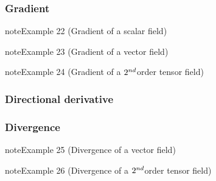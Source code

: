 \documentclass[letterpaper,10pt,english]{jupyterBook}
\begin{document}
\subsubsection{Gradient}
\label{\detokenize{ch/tensor-algebra-calculus/calculus-euclidean-spherical:gradient}}\label{\detokenize{ch/tensor-algebra-calculus/calculus-euclidean-spherical:tensor-calculus-spherical-differential-operators-gradient}}\label{ch/tensor-algebra-calculus/calculus-euclidean-spherical:example-0}
\begin{sphinxadmonition}{note}{Example 22 (Gradient of a scalar field)}


\end{sphinxadmonition}
\label{ch/tensor-algebra-calculus/calculus-euclidean-spherical:example-1}
\begin{sphinxadmonition}{note}{Example 23 (Gradient of a vector field)}


\end{sphinxadmonition}
\label{ch/tensor-algebra-calculus/calculus-euclidean-spherical:example-2}
\begin{sphinxadmonition}{note}{Example 24 (Gradient of a \protect\(2^{nd}\protect\)\sphinxhyphen{}order tensor field)}


\end{sphinxadmonition}


\subsubsection{Directional derivative}
\label{\detokenize{ch/tensor-algebra-calculus/calculus-euclidean-spherical:directional-derivative}}\label{\detokenize{ch/tensor-algebra-calculus/calculus-euclidean-spherical:tensor-calculus-spherical-differential-operators-directional-der}}

\subsubsection{Divergence}
\label{\detokenize{ch/tensor-algebra-calculus/calculus-euclidean-spherical:divergence}}\label{\detokenize{ch/tensor-algebra-calculus/calculus-euclidean-spherical:tensor-calculus-spherical-differential-operators-divergence}}\label{ch/tensor-algebra-calculus/calculus-euclidean-spherical:example-3}
\begin{sphinxadmonition}{note}{Example 25 (Divergence of a vector field)}


\end{sphinxadmonition}
\label{ch/tensor-algebra-calculus/calculus-euclidean-spherical:example-4}
\begin{sphinxadmonition}{note}{Example 26 (Divergence of a \protect\(2^{nd}\protect\)\sphinxhyphen{}order tensor field)}


\end{sphinxadmonition}
\end{document}
